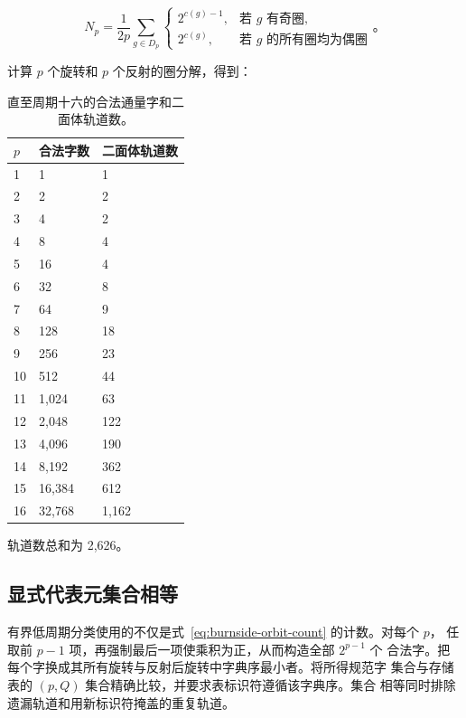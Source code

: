 \begin{equation}
\label{eq:burnside-orbit-count}
N_p=\frac{1}{2p}\sum_{g\in D_p}\begin{cases}2^{c(g)-1}, & \text{若 }g\text{ 有奇圈}, \\
2^{c(g)}, & \text{若 }g\text{ 的所有圈均为偶圈}
\end{cases}
\text{。}
\end{equation}

计算 \(p\) 个旋转和 \(p\) 个反射的圈分解，得到：

\begin{table}[tbp]
\centering
\caption{直至周期十六的合法通量字和二面体轨道数。}
\label{tab:low-period-orbit-counts}
\begingroup
\renewcommand{\arraystretch}{1.12}
\begin{tabular}{lll}
\toprule
\(p\) & 合法字数 & 二面体轨道数 \\
\midrule
1 & 1 & 1 \\
2 & 2 & 2 \\
3 & 4 & 2 \\
4 & 8 & 4 \\
5 & 16 & 4 \\
6 & 32 & 8 \\
7 & 64 & 9 \\
8 & 128 & 18 \\
9 & 256 & 23 \\
10 & 512 & 44 \\
11 & 1,024 & 63 \\
12 & 2,048 & 122 \\
13 & 4,096 & 190 \\
14 & 8,192 & 362 \\
15 & 16,384 & 612 \\
16 & 32,768 & 1,162 \\
\bottomrule
\end{tabular}
\endgroup
\end{table}

轨道数总和为 2,626。

\subsection{显式代表元集合相等}

有界低周期分类使用的不仅是式~\eqref{eq:burnside-orbit-count} 的计数。对每个 \(p\)，
任取前 \(p-1\) 项，再强制最后一项使乘积为正，从而构造全部 \(2^{p-1}\) 个
合法字。把每个字换成其所有旋转与反射后旋转中字典序最小者。将所得规范字
集合与存储表的 \((p,Q)\) 集合精确比较，并要求表标识符遵循该字典序。集合
相等同时排除遗漏轨道和用新标识符掩盖的重复轨道。

